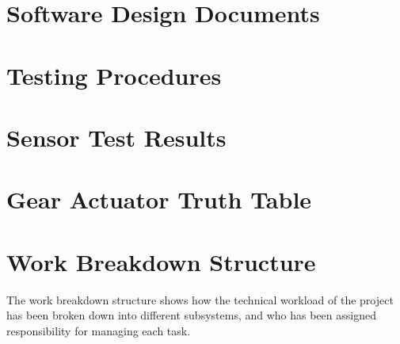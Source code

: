 \documentclass[main.tex]{subfiles}
\begin{document}
\begin{appendices}
\chapter{Software Design Documents}

\chapter{Testing Procedures}

\chapter{Sensor Test Results}

\chapter{Gear Actuator Truth Table}

\chapter{Work Breakdown Structure}
The work breakdown structure shows how the technical workload of the project has been broken down into different  subsystems, and who has been assigned responsibility for managing each task. 


\end{appendices}
\end{document}
